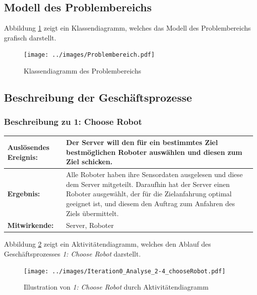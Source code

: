 \documentclass[includeheaders]{scrartcl}
\begin{document}
		\subsection{Modell des Problembereichs}
		Abbildung \ref{fig:2-3-modell-problembereich} zeigt ein Klassendiagramm, welches das Modell des Problembereichs grafisch darstellt.
		\begin{figure}[H]
			\centering
			\texttt{[image: ../images/Problembereich.pdf]}
			\caption{Klassendiagramm des Problembereichs}
			\label{fig:2-3-modell-problembereich}
		\end{figure}

		\subsection{Beschreibung der Geschäftsprozesse}

			\subsubsection*{Beschreibung zu 1: Choose Robot}

			\begin{table}[H]
				\centering
				\begin{tabularx}{\textwidth}{@{}p{3cm}X@{}}
				\toprule
				\textbf{Auslösendes Ereignis:} & Der Server will den für ein bestimmtes Ziel bestmöglichen Roboter auswählen und diesen zum Ziel schicken. \\ \midrule
				\textbf{Ergebnis:} & Alle Roboter haben ihre Sensordaten ausgelesen und diese dem Server
				mitgeteilt. Daraufhin hat der Server einen Roboter ausgewählt, der für
				die Zielanfahrung optimal geeignet ist, und diesem den Auftrag zum
				Anfahren des Ziels übermittelt. \\ \midrule
				\textbf{Mitwirkende:} &	Server, Roboter \\
				\bottomrule
				\end{tabularx}
				\label{tab:2-4-choose-robot}
			\end{table}

			Abbildung \ref{fig:2-4-choose-robot-aktivitaetendiagramm} zeigt ein Aktivitätendiagramm, welches den Ablauf des Geschäftsprozesses \emph{1: Choose Robot} darstellt.
			\begin{figure}[H]
				\centering
				\texttt{[image: ../images/Iteration0\_Analyse\_2-4\_chooseRobot.pdf]}
				\caption{Illustration von \emph{1: Choose Robot} durch Aktivitätendiagramm}
				\label{fig:2-4-choose-robot-aktivitaetendiagramm}
			\end{figure}
\end{document}
